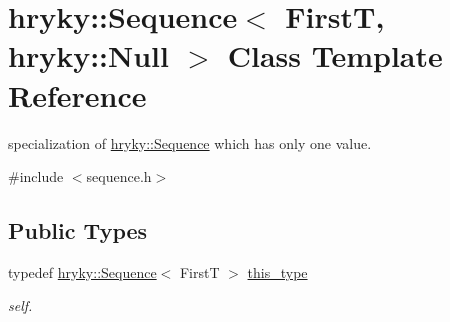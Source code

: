 \hypertarget{classhryky_1_1_sequence_3_01_first_t_00_01hryky_1_1_null_01_4}{\section{hryky\-:\-:Sequence$<$ First\-T, hryky\-:\-:Null $>$ Class Template Reference}
\label{classhryky_1_1_sequence_3_01_first_t_00_01hryky_1_1_null_01_4}
}


specialization of \hyperlink{classhryky_1_1_sequence}{hryky\-::\-Sequence} which has only one value.  




{\ttfamily \#include $<$sequence.\-h$>$}

\subsection*{Public Types}
\begin{DoxyCompactItemize}
\item 
\hypertarget{classhryky_1_1_sequence_3_01_first_t_00_01hryky_1_1_null_01_4_a531b9af90406628444e691463b0611a4}{typedef \hyperlink{classhryky_1_1_sequence}{hryky\-::\-Sequence}$<$ First\-T $>$ \hyperlink{classhryky_1_1_sequence_3_01_first_t_00_01hryky_1_1_null_01_4_a531b9af90406628444e691463b0611a4}{this\-\_\-type}}\label{classhryky_1_1_sequence_3_01_first_t_00_01hryky_1_1_null_01_4_a531b9af90406628444e691463b0611a4}

\begin{DoxyCompactList}\small\item\em self. \end{DoxyCompactList}\end{DoxyCompactItemize}
